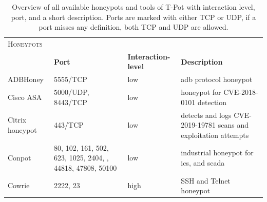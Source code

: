 \begin{table}
    \centering
    \caption[Overview honeypots of T-Pot]{Overview of all available honeypots and tools of T-Pot with interaction level, port, and a short description. Ports are marked with either TCP or UDP, if a port misses any definition, both TCP and UDP are allowed.}
    \begin{tabularx}{\linewidth}{l|XlX}
        \toprule
        \textsc{Honeypots}                        & \multicolumn{3}{c}{}                                                                                                                                                                                                            \\
                                                  & \textbf{Port}                                                                                               & \textbf{Interaction-level} & \textbf{Description}                                                                 \\
        \hline
        ADBHoney \cite{adbhoney2021}              & 5555/TCP                                                                                                    & low                        & \ac{adb} protocol honeypot                                                           \\
        Cisco ASA \cite{cymmetria2018}            & 5000/UDP, 8443/TCP                                                                                          & low                        & honeypot for CVE-2018-0101\cite{CVE-2018-0101} detection                             \\
        Citrix honeypot \cite{citrixhoneypot2020} & 443/TCP                                                                                                     & low                        & detects and logs CVE-2019-19781\cite{CVE-2019-19781} scans and exploitation attempts \\
        Conpot \cite{conpot2021}                  & 80, 102, 161, 502, 623, 1025, 2404, \newline 10001, 44818, 47808, 50100                                     & low                        & industrial honeypot for \ac{ics}, and \ac{scada}                                     \\
        Cowrie \cite{cowrie2021}                  & 2222, 23                                                                                                    & high                       & SSH and Telnet honeypot                                                              \\

\end{tabularx}
\end{table}
